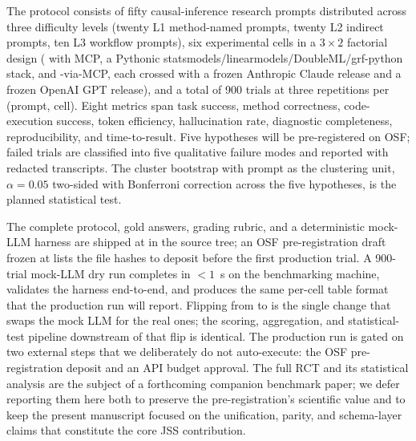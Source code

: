 The protocol consists of fifty causal-inference research prompts
distributed across three difficulty levels (twenty L1 method-named
prompts, twenty L2 indirect prompts, ten L3 workflow prompts), six
experimental cells in a $3 \times 2$ factorial design (\statspai{}
with MCP, a Pythonic statsmodels/linearmodels/DoubleML/grf-python
stack, and -via-MCP, each crossed with a frozen
Anthropic Claude release and a frozen OpenAI GPT release), and a
total of 900 trials at three repetitions per (prompt, cell). Eight
metrics span task success, method correctness, code-execution
success, token efficiency, hallucination rate, diagnostic
completeness, reproducibility, and time-to-result. Five hypotheses
will be pre-registered on OSF; failed trials are classified into
five qualitative failure modes and reported with redacted
transcripts. The cluster bootstrap with prompt as the clustering
unit, $\alpha = 0.05$ two-sided with Bonferroni correction across
the five hypotheses, is the planned statistical test.

The complete protocol, gold answers, grading rubric, and a
deterministic mock-LLM harness are shipped at
 in the source tree; an OSF
pre-registration draft frozen at
 lists the file
hashes to deposit before the first production trial. A 900-trial
mock-LLM dry run completes in $<1$~s on the benchmarking machine,
validates the harness end-to-end, and produces the same per-cell
table format that the production run will report. Flipping
 from  to  is the
single change that swaps the mock LLM for the real ones; the
scoring, aggregation, and statistical-test pipeline downstream of
that flip is identical. The production run is gated on two
external steps that we deliberately do not auto-execute: the OSF
pre-registration deposit and an API budget approval. The full RCT
and its statistical analysis are the subject of a forthcoming
companion benchmark paper; we defer reporting them here both to
preserve the pre-registration's scientific value and to keep the
present manuscript focused on the unification, parity, and
schema-layer claims that constitute the core JSS contribution.
